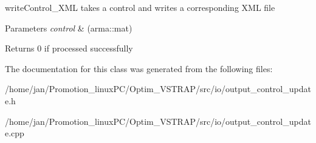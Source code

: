 write\+Control\+\_\+\+X\+ML takes a control and writes a corresponding X\+ML file 


\begin{DoxyParams}{Parameters}
{\em control} & (arma\+::mat) \\
\hline
\end{DoxyParams}
\begin{DoxyReturn}{Returns}
0 if processed successfully 
\end{DoxyReturn}


The documentation for this class was generated from the following files\+:\begin{DoxyCompactItemize}
\item 
/home/jan/\+Promotion\+\_\+linux\+P\+C/\+Optim\+\_\+\+V\+S\+T\+R\+A\+P/src/io/output\+\_\+control\+\_\+update.\+h\item 
/home/jan/\+Promotion\+\_\+linux\+P\+C/\+Optim\+\_\+\+V\+S\+T\+R\+A\+P/src/io/output\+\_\+control\+\_\+update.\+cpp\end{DoxyCompactItemize}
